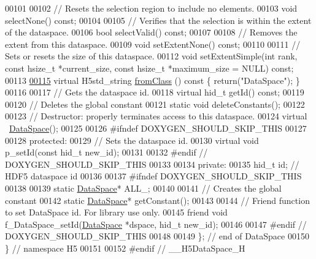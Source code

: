 \begin{DoxyCode}
00101 
00102         \textcolor{comment}{// Resets the selection region to include no elements.}
00103         \textcolor{keywordtype}{void} selectNone() \textcolor{keyword}{const};
00104 
00105         \textcolor{comment}{// Verifies that the selection is within the extent of the dataspace.}
00106         \textcolor{keywordtype}{bool} selectValid() \textcolor{keyword}{const};
00107 
00108         \textcolor{comment}{// Removes the extent from this dataspace.}
00109         \textcolor{keywordtype}{void} setExtentNone() \textcolor{keyword}{const};
00110 
00111         \textcolor{comment}{// Sets or resets the size of this dataspace.}
00112         \textcolor{keywordtype}{void} setExtentSimple(\textcolor{keywordtype}{int} rank, \textcolor{keyword}{const} hsize\_t *current\_size, \textcolor{keyword}{const} hsize\_t *maximum\_size = NULL) \textcolor{keyword}{
      const};
00113 
\hyperlink{class_h5_1_1_data_space_a127e32a992f905e055ba1576d18c7d1f}{00115}         \textcolor{keyword}{virtual} H5std\_string \hyperlink{class_h5_1_1_data_space_a127e32a992f905e055ba1576d18c7d1f}{fromClass} ()\textcolor{keyword}{ const }\{ \textcolor{keywordflow}{return}(\textcolor{stringliteral}{"DataSpace"}); \}
00116 
00117         \textcolor{comment}{// Gets the dataspace id.}
00118         \textcolor{keyword}{virtual} hid\_t getId() \textcolor{keyword}{const};
00119 
00120         \textcolor{comment}{// Deletes the global constant}
00121         \textcolor{keyword}{static} \textcolor{keywordtype}{void} deleteConstants();
00122 
00123         \textcolor{comment}{// Destructor: properly terminates access to this dataspace.}
00124         \textcolor{keyword}{virtual} ~\hyperlink{class_h5_1_1_data_space}{DataSpace}();
00125 
00126 \textcolor{preprocessor}{#ifndef DOXYGEN\_SHOULD\_SKIP\_THIS}
00127 
00128    \textcolor{keyword}{protected}:
00129         \textcolor{comment}{// Sets the dataspace id.}
00130         \textcolor{keyword}{virtual} \textcolor{keywordtype}{void} p\_setId(\textcolor{keyword}{const} hid\_t new\_id);
00131 
00132 \textcolor{preprocessor}{#endif // DOXYGEN\_SHOULD\_SKIP\_THIS}
00133 
00134    \textcolor{keyword}{private}:
00135         hid\_t id;       \textcolor{comment}{// HDF5 dataspace id}
00136 
00137 \textcolor{preprocessor}{#ifndef DOXYGEN\_SHOULD\_SKIP\_THIS}
00138 
00139         \textcolor{keyword}{static} \hyperlink{class_h5_1_1_data_space}{DataSpace}* ALL\_;
00140 
00141         \textcolor{comment}{// Creates the global constant}
00142         \textcolor{keyword}{static} \hyperlink{class_h5_1_1_data_space}{DataSpace}* getConstant();
00143 
00144         \textcolor{comment}{// Friend function to set DataSpace id.  For library use only.}
00145         \textcolor{keyword}{friend} \textcolor{keywordtype}{void} f\_DataSpace\_setId(\hyperlink{class_h5_1_1_data_space}{DataSpace} *dspace, hid\_t new\_id);
00146 
00147 \textcolor{preprocessor}{#endif // DOXYGEN\_SHOULD\_SKIP\_THIS}
00148 
00149 \}; \textcolor{comment}{// end of DataSpace}
00150 \} \textcolor{comment}{// namespace H5}
00151 
00152 \textcolor{preprocessor}{#endif // \_\_H5DataSpace\_H}
\end{DoxyCode}
